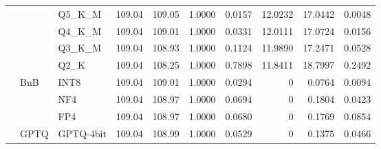 \begin{longtable}{ll l rrrrrrr}
 &  & Q5\_K\_M & 109.04 & 109.05 & 1.0000 & 0.0157 & 12.0232 & 17.0442 & 0.0048 \\
 &  & Q4\_K\_M & 109.04 & 109.01 & 1.0000 & 0.0331 & 12.0111 & 17.0724 & 0.0156 \\
 &  & Q3\_K\_M & 109.04 & 108.93 & 1.0000 & 0.1124 & 11.9890 & 17.2471 & 0.0528 \\
 &  & Q2\_K & 109.04 & 108.25 & 1.0000 & 0.7898 & 11.8411 & 18.7997 & 0.2492 \\
 & BnB & INT8 & 109.04 & 109.01 & 1.0000 & 0.0294 & \cellcolor{cyan!12} $0$ & 0.0764 & 0.0094 \\
 &  & NF4 & 109.04 & 108.97 & 1.0000 & 0.0694 & \cellcolor{cyan!12} $0$ & 0.1804 & 0.0423 \\
 &  & FP4 & 109.04 & 108.97 & 1.0000 & 0.0680 & \cellcolor{cyan!12} $0$ & 0.1769 & 0.0854 \\
 & GPTQ & GPTQ-4bit & 109.04 & 108.99 & 1.0000 & 0.0529 & \cellcolor{cyan!12} $0$ & 0.1375 & 0.0466 \\
\end{longtable}
\endgroup